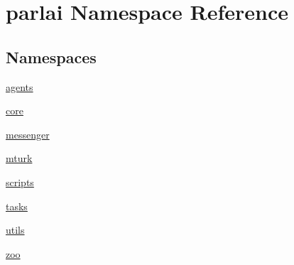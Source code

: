 \hypertarget{namespaceparlai}{}\section{parlai Namespace Reference}
\label{namespaceparlai}
\subsection*{Namespaces}
\begin{DoxyCompactItemize}
\item 
 \hyperlink{namespaceparlai_1_1agents}{agents}
\item 
 \hyperlink{namespaceparlai_1_1core}{core}
\item 
 \hyperlink{namespaceparlai_1_1messenger}{messenger}
\item 
 \hyperlink{namespaceparlai_1_1mturk}{mturk}
\item 
 \hyperlink{namespaceparlai_1_1scripts}{scripts}
\item 
 \hyperlink{namespaceparlai_1_1tasks}{tasks}
\item 
 \hyperlink{namespaceparlai_1_1utils}{utils}
\item 
 \hyperlink{namespaceparlai_1_1zoo}{zoo}
\end{DoxyCompactItemize}
